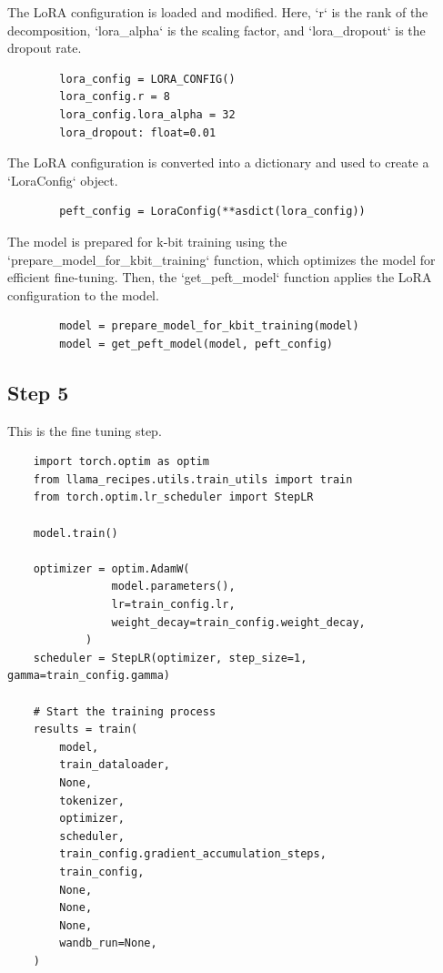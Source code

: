 \documentclass{solutionclass} %
\begin{document}
\begin{solution}
	The LoRA configuration is loaded and modified. Here, `r` is the rank of the decomposition, `lora\_alpha` is the scaling factor, and `lora\_dropout` is the dropout rate.
	\begin{lstlisting}
		lora_config = LORA_CONFIG()
		lora_config.r = 8
		lora_config.lora_alpha = 32
		lora_dropout: float=0.01
	\end{lstlisting}
\end{solution}

\begin{solution}
	The LoRA configuration is converted into a dictionary and used to create a `LoraConfig` object.
	\begin{lstlisting}
		peft_config = LoraConfig(**asdict(lora_config))
	\end{lstlisting}
\end{solution}

\begin{solution}
	The model is prepared for k-bit training using the `prepare\_model\_for\_kbit\_training` function, which optimizes the model for efficient fine-tuning. Then, the `get\_peft\_model` function applies the LoRA configuration to the model.
	\begin{lstlisting}
		model = prepare_model_for_kbit_training(model)
		model = get_peft_model(model, peft_config)
	\end{lstlisting}
\end{solution}


\subsection*{Step 5}

This is the fine tuning step.


\begin{lstlisting}
	import torch.optim as optim
	from llama_recipes.utils.train_utils import train
	from torch.optim.lr_scheduler import StepLR
	
	model.train()
	
	optimizer = optim.AdamW(
				model.parameters(),
				lr=train_config.lr,
				weight_decay=train_config.weight_decay,
			)
	scheduler = StepLR(optimizer, step_size=1, gamma=train_config.gamma)
	
	# Start the training process
	results = train(
		model,
		train_dataloader,
		None,
		tokenizer,
		optimizer,
		scheduler,
		train_config.gradient_accumulation_steps,
		train_config,
		None,
		None,
		None,
		wandb_run=None,
	)
	\end{lstlisting}
\end{document}
